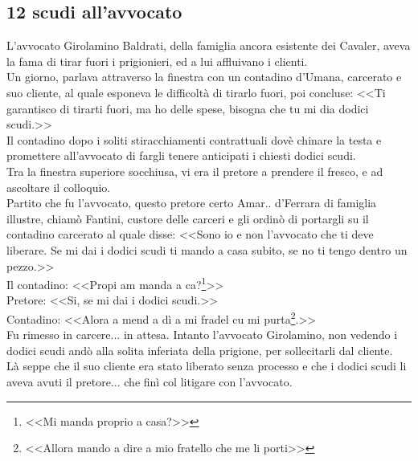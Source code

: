 \subsection{12 scudi all'avvocato}
L'avvocato Girolamino Baldrati, della famiglia ancora esistente dei Cavaler, aveva la fama di tirar fuori i prigionieri, ed a lui affluivano i clienti. \\
\indent Un giorno, parlava attraverso la finestra con un contadino d'Umana, carcerato e suo cliente, al quale esponeva le difficoltà di tirarlo fuori, poi concluse: <<Ti garantisco di tirarti fuori, ma ho delle spese, bisogna che tu mi dia dodici scudi.>>\\
\indent Il contadino dopo i soliti stiracchiamenti contrattuali dovè chinare la testa e promettere all'avvocato di fargli tenere anticipati i chiesti dodici scudi.\\
\indent Tra la finestra superiore socchiusa, vi era il pretore a prendere il fresco, e ad ascoltare il colloquio.\\
\indent Partito che fu l'avvocato, questo pretore certo Amar\:.\:. d'Ferrara di famiglia illustre, chiamò Fantini, custore delle carceri e gli ordinò di portargli su il contadino carcerato al quale disse: <<Sono io e non l'avvocato che ti deve liberare. Se mi dai i dodici scudi ti mando a casa subito, se no ti tengo dentro un pezzo.>>\\
\indent Il contadino: <<Propi am manda a ca?\footnote{<<Mi manda proprio a casa?>>}>>\\
\indent Pretore: <<Si, se mi dai i dodici scudi.>>\\
\indent Contadino: <<Alora a mend a dì a mi fradel cu mi purta\footnote{<<Allora mando a dire a mio fratello che me li porti>>}.>>\\
\indent Fu rimesso in carcere... in attesa. Intanto l'avvocato Girolamino, non vedendo i dodici scudi andò alla solita inferiata della prigione, per sollecitarli dal cliente.\\
\indent Là seppe che il suo cliente era stato liberato senza processo e che i dodici scudi li aveva avuti il pretore... che finì col litigare con l'avvocato.

